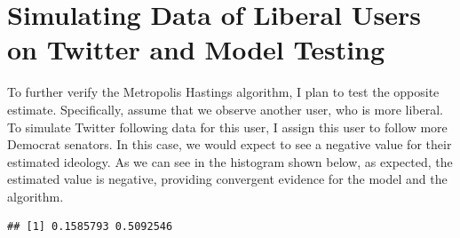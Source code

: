 \documentclass[]{book}
\newenvironment{Shaded}{\begin{snugshade}}{\end{snugshade}}
\newcommand{\KeywordTok}[1]{\textcolor[rgb]{0.13,0.29,0.53}{\textbf{#1}}}
\newcommand{\DataTypeTok}[1]{\textcolor[rgb]{0.13,0.29,0.53}{#1}}
\newcommand{\DecValTok}[1]{\textcolor[rgb]{0.00,0.00,0.81}{#1}}
\newcommand{\StringTok}[1]{\textcolor[rgb]{0.31,0.60,0.02}{#1}}
\newcommand{\CommentTok}[1]{\textcolor[rgb]{0.56,0.35,0.01}{\textit{#1}}}
\newcommand{\OperatorTok}[1]{\textcolor[rgb]{0.81,0.36,0.00}{\textbf{#1}}}
\newcommand{\NormalTok}[1]{#1}
\begin{document}
\section{Simulating Data of Liberal Users on Twitter and Model
Testing}\label{simulating-data-of-liberal-users-on-twitter-and-model-testing}

To further verify the Metropolis Hastings algorithm, I plan to test the
opposite estimate. Specifically, assume that we observe another user,
who is more liberal. To simulate Twitter following data for this user, I
assign this user to follow more Democrat senators. In this case, we
would expect to see a negative value for their estimated ideology. As we
can see in the histogram shown below, as expected, the estimated value
is negative, providing convergent evidence for the model and the
algorithm.

\begin{Shaded}
\end{Shaded}

\begin{verbatim}
## [1] 0.1585793 0.5092546
\end{verbatim}

\begin{Shaded}
\end{Shaded}
\end{document}
